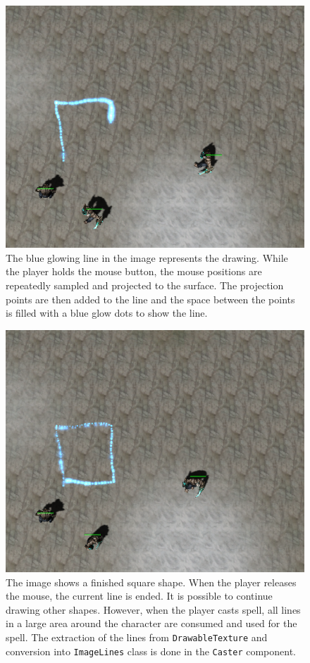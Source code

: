 \begin{figure}[p]
\centering
\includegraphics[width=.6\linewidth]{ext/scr/komix2.png}
\caption{The blue glowing line in the image represents the drawing. While the player holds the mouse button, the mouse positions are repeatedly sampled and projected to the surface. The projection points are then added to the line and the space between the points is filled with a blue glow dots to show the line. }
\label{fig:drawing}
\end{figure}

\begin{figure}[p]
\centering
\includegraphics[width=.6\linewidth]{ext/scr/komix3.png}
\caption{The image shows a finished square shape. When the player releases the mouse, the current line is ended. It is possible to continue drawing other shapes. However, when the player casts spell, all lines in a large area around the character are consumed and used for the spell. The extraction of the lines from \texttt{DrawableTexture} and conversion into \texttt{ImageLines} class is done in the \texttt{Caster} component. }
\label{fig:square}
\end{figure}

